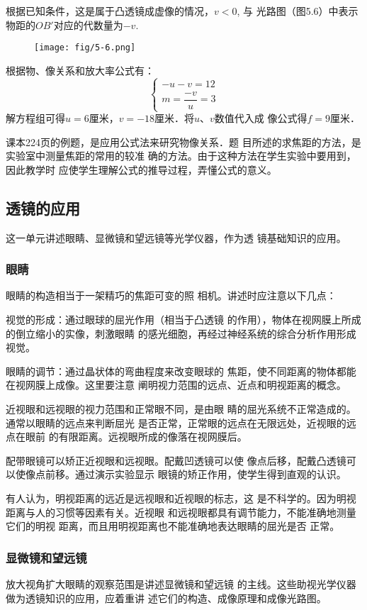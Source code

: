 根据已知条件，这是属于凸透镜成虚像的情况，$v<0$, 与
光路图（图5.6）中表示物距的$OB'$对应的代数量为$-v$.
\begin{figure}[htp]
    \centering
    \texttt{[image: fig/5-6.png]}
    \caption{}
\end{figure}

根据物、像关系和放大率公式有：
\[\begin{cases}
    -u-v=12\\
    m=\dfrac{-v}{u}=3
\end{cases}\]
解方程组可得$u=6$厘米，$v=-18$厘米．将$u$、$v$数值代入成
像公式得$f=9$厘米．

课本224页的例题，是应用公式法来研究物像关系．题
目所述的求焦距的方法，是实验室中测量焦距的常用的较准
确的方法。由于这种方法在学生实验中要用到，因此教学时
应使学生理解公式的推导过程，弄懂公式的意义。

\subsection{透镜的应用}
这一单元讲述眼睛、显微镜和望远镜等光学仪器，作为透
镜基础知识的应用。

\subsubsection{眼睛}

眼睛的构造相当于一架精巧的焦距可变的照
相机。讲述时应注意以下几点：

视觉的形成：通过眼球的屈光作用（相当于凸透镜
的作用），物体在视网膜上所成的倒立缩小的实像，刺激眼睛
的感光细胞，再经过神经系统的综合分析作用形成视觉。

眼睛的调节：通过晶状体的弯曲程度来改变眼球的
焦距，使不同距离的物体都能在视网膜上成像。这里要注意
阐明视力范围的远点、近点和明视距离的概念。

近视眼和远视眼的视力范围和正常眼不同，是由眼
睛的屈光系统不正常造成的。通常以眼睛的远点来判断屈光
是否正常，正常眼的远点在无限远处，近视眼的远点在眼前
的有限距离。远视眼所成的像落在视网膜后。

配带眼镜可以矫正近视眼和远视眼。配戴凹透镜可以使
像点后移，配戴凸透镜可以使像点前移。通过演示实验显示
眼镜的矫正作用，使学生得到直观的认识。

有人认为，明视距离的远近是远视眼和近视眼的标志，这
是不科学的。因为明视距离与人的习惯等因素有关。近视眼
和远视眼都具有调节能力，不能准确地测量它们的明视
距离，而且用明视距离也不能准确地表达眼睛的屈光是否
正常。

\subsubsection{显微镜和望远镜}
放大视角扩大眼睛的观察范围是讲述显微镜和望远镜
的主线。这些助视光学仪器做为透镜知识的应用，应着重讲
述它们的构造、成像原理和成像光路图。

